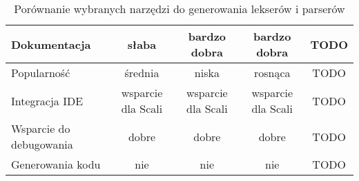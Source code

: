 \begin{table}[ht]
\begin{tabular}{L|CCCC}
    \hline
    Dokumentacja & słaba & bardzo dobra & bardzo dobra & TODO \\ 
    \hline
    Popularność & średnia & niska & rosnąca & TODO \\ 
    \hline
    Integracja IDE & wsparcie dla Scali & wsparcie dla Scali & wsparcie dla Scali & TODO \\ 
    \hline
    Wsparcie do debugowania & dobre & dobre & dobre & TODO \\ 
    \hline
    Generowania kodu & nie & nie & nie & TODO \\ 
    \bottomrule
    \end{tabular}
    \caption{Porównanie wybranych narzędzi do generowania lekserów i parserów}
    \label{tab:porownanie-alternatyw_2}
\end{table}
